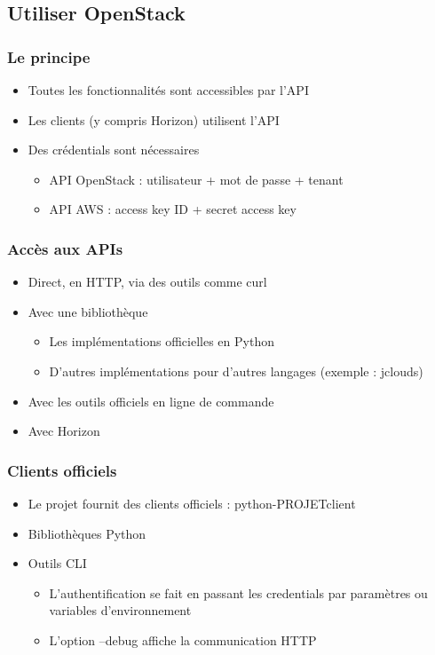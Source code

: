   \subsection[Utilisation]{Utiliser OpenStack}

  \begin{frame}
    \frametitle{Le principe}
    \begin{itemize}
      \item Toutes les fonctionnalités sont accessibles par l'API
      \item Les clients (y compris Horizon) utilisent l'API
      \item Des crédentials sont nécessaires
      \begin{itemize}
        \item API OpenStack : utilisateur + mot de passe + tenant
        \item API AWS : access key ID + secret access key
      \end{itemize}
    \end{itemize}
  \end{frame}

  \begin{frame}
    \frametitle{Accès aux APIs}
    \begin{itemize}
      \item Direct, en HTTP, via des outils comme curl
      \item Avec une bibliothèque
      \begin{itemize}
        \item Les implémentations officielles en Python
        \item D'autres implémentations pour d'autres langages (exemple : jclouds)
      \end{itemize}
      \item Avec les outils officiels en ligne de commande
      \item Avec Horizon
    \end{itemize}
  \end{frame}

  \begin{frame}
    \frametitle{Clients officiels}
    \begin{itemize}
      \item Le projet fournit des clients officiels : python-PROJETclient
      \item Bibliothèques Python
      \item Outils CLI
      \begin{itemize}
        \item L'authentification se fait en passant les credentials par paramètres ou variables d'environnement
        \item L'option --debug affiche la communication HTTP
      \end{itemize}
    \end{itemize}
  \end{frame}
